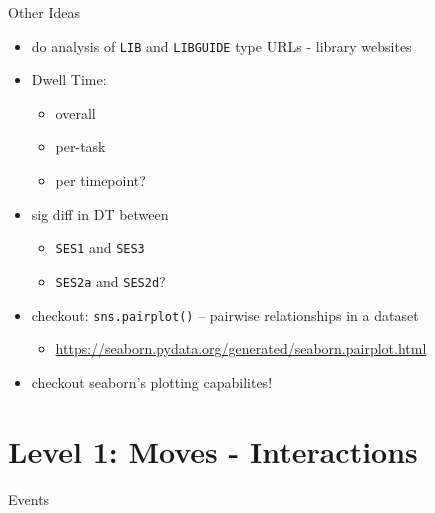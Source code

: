 \documentclass[letterpaper, nobind]{templates/ociamthesis}
\providecommand{\tightlist}{%
  \setlength{\itemsep}{0pt}\setlength{\parskip}{0pt}}
\begin{document}
Other Ideas

\begin{itemize}
\tightlist
\item
  do analysis of \texttt{LIB} and \texttt{LIBGUIDE} type URLs - library websites
\item
  Dwell Time:

  \begin{itemize}
  \tightlist
  \item
    overall
  \item
    per-task
  \item
    per timepoint?
  \end{itemize}
\item
  sig diff in DT between

  \begin{itemize}
  \tightlist
  \item
    \texttt{SES1} and \texttt{SES3}
  \item
    \texttt{SES2a} and \texttt{SES2d}?
  \end{itemize}
\item
  checkout: \texttt{sns.pairplot()} -- pairwise relationships in a dataset

  \begin{itemize}
  \tightlist
  \item
    \url{https://seaborn.pydata.org/generated/seaborn.pairplot.html}
  \end{itemize}
\item
  checkout seaborn's plotting capabilites!
\end{itemize}

\hypertarget{level-1-moves---interactions}{%
\section{Level 1: Moves - Interactions}\label{level-1-moves---interactions}}

Events
\end{document}

